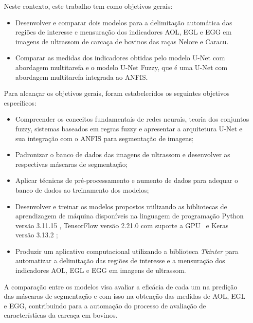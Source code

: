 Neste contexto, este trabalho tem como objetivos gerais:
\begin{itemize}
    \item Desenvolver e comparar dois modelos para a delimitação automática das regiões de interesse e mensuração dos indicadores AOL, EGL e EGG em imagens de ultrassom de carcaça de bovinos das raças Nelore e Caracu.
    \item Comparar as medidas dos indicadores obtidas pelo modelo U-Net com abordagem multitarefa e o modelo U-Net Fuzzy, que é uma U-Net com abordagem multitarefa integrada ao ANFIS.
\end{itemize}
Para alcançar os objetivos gerais, foram estabelecidos os seguintes objetivos específicos:
\begin{itemize}
    \item Compreender os conceitos fundamentais de redes neurais, teoria dos conjuntos fuzzy, sistemas baseados em regras fuzzy e apresentar a arquitetura U-Net  e sua integração com o ANFIS para segmentação de imagens;
    \item Padronizar o banco de dados das imagens de ultrassom e desenvolver as respectivas máscaras de segmentação;
    \item Aplicar técnicas de pré-processamento e aumento de dados para adequar o banco de dados ao treinamento dos modelos;
    \item Desenvolver e treinar os modelos propostos utilizando as bibliotecas de aprendizagem de máquina disponíveis na linguagem de programação Python versão 3.11.15 \cite{python}, TensorFlow versão 2.21.0 com suporte a GPU~\cite{TensorFlowSite} e Keras versão 3.13.2 \cite{KerasSite};
    \item Produzir um aplicativo computacional utilizando a biblioteca \textit{Tkinter} \cite{tkinter} para automatizar a delimitação das regiões de interesse e a mensuração dos indicadores AOL, EGL e EGG em imagens de ultrassom.
\end{itemize}

A comparação entre os modelos visa avaliar a eficácia de cada um na predição das máscaras de segmentação e com isso na obtenção das medidas de AOL, EGL e EGG, contribuindo para a automação do processo de avaliação de características da carcaça em bovinos. 

